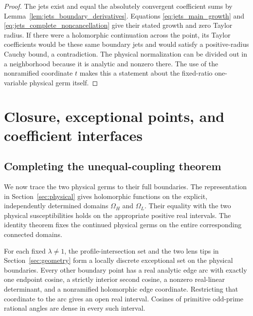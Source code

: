 \documentclass[11pt]{article}
\numberwithin{equation}{section}
\theoremstyle{definition}
\newcommand{\OH}{\Omega_H}
\newcommand{\OL}{\Omega_L}
\begin{document}
\begin{proof}
The jets exist and equal the absolutely convergent coefficient
sums by Lemma~\ref{lem:jets_boundary_derivatives}. Equations
\eqref{eq:jets_main_growth} and
\eqref{eq:jets_complete_noncancellation} give their stated
growth and zero Taylor radius. If there were a holomorphic
continuation across the point, its Taylor coefficients would be
these same boundary jets and would satisfy a positive-radius
Cauchy bound, a contradiction. The physical normalization can
be divided out in a neighborhood because it is analytic and
nonzero there. The use of the nonramified coordinate $t$ makes
this a statement about the fixed-ratio one-variable physical
germ itself.
\end{proof}




\section{Closure, exceptional points, and coefficient interfaces}\label{sec:closure}

\subsection{Completing the unequal-coupling theorem}
We now trace the two physical germs to their full boundaries. The
representation in Section~\ref{sec:physical} gives holomorphic functions
on the explicit, independently determined domains $\OH$ and $\OL$.
Their equality with the two physical susceptibilities holds on the
appropriate positive real intervals. The identity theorem fixes the
continued physical germs on the entire corresponding connected domains.

For each fixed $\lambda\ne1$, the profile-intersection set and the
two lens tips in Section~\ref{sec:geometry} form a locally discrete
exceptional set on the physical boundaries. Every other boundary
point has a real analytic edge arc with exactly one endpoint cosine,
a strictly interior second cosine, a nonzero real-linear determinant,
and a nonramified holomorphic edge coordinate. Restricting that
coordinate to the arc gives an open real interval. Cosines of primitive
odd-prime rational angles are dense in every such interval.
\end{document}
